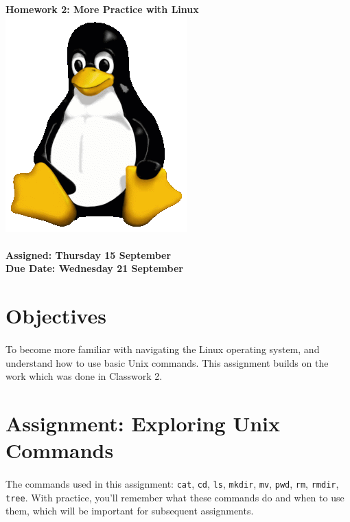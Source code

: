 \documentclass[letter,11pt]{article}
\begin{document}
\huge
\textbf{Homework 2: More Practice with Linux} \includegraphics[scale=0.07]{Images/Tux.png}
\normalsize
\\ ~~ \\
\textbf{Assigned: Thursday 15 September} \\
\textbf{Due Date: Wednesday 21 September}

\section*{Objectives}
\paragraph{}To become more familiar with navigating the Linux operating system, and understand how to use basic Unix commands. This assignment builds on the work which was done in Classwork 2.

\section*{Assignment: Exploring Unix Commands}
\paragraph{}The commands used in this assignment: \texttt{cat}, \texttt{cd}, \texttt{ls}, \texttt{mkdir}, \texttt{mv}, \texttt{pwd}, \texttt{rm}, \texttt{rmdir}, \texttt{tree}. With practice, you'll remember what these commands do and when to use them, which will be important for subsequent assignments.
\end{document}
